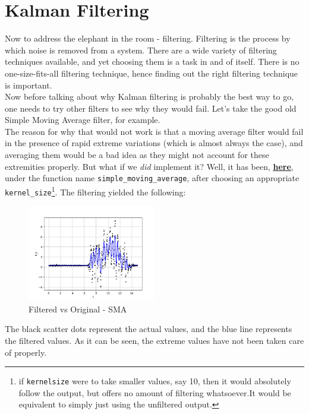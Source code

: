 \documentclass[oneside]{book}
\begin{document}
\chapter{Kalman Filtering} \label{Kalman Filter chapter}
Now to address the elephant in the room - filtering. Filtering is the process by which noise is removed from a system. There are a wide variety of filtering techniques available, and yet choosing them is a task in and of itself. There is no one-size-fits-all filtering technique, hence finding out the right filtering technique is important.\\ 
\bigskip
Now before talking about why Kalman filtering is probably the best way to go, one needs to try other filters to see why they would fail. Let's take the good old Simple Moving Average filter, for example. \\
The reason for why that would not work is that a moving average filter would fail in the presence of rapid extreme variations (which is almost always the case), and averaging them would be a bad idea as they might not account for these extremities properly.
But what if we \textit{did} implement it? Well, it has been, \href{https://github.com/HarryNyquist/Odometry/blob/main/Odometry_Bad_Tries/Bad_Filter_attempts.py}{\underline{\textbf{here}}}, under the function name \verb|simple_moving_average|, after choosing an appropriate \\ \verb|kernel_size|\footnote{if \texttt{kernel\textunderscore size} were to take smaller values, say 10, then it would absolutely follow the output, but offers no amount of filtering whatsoever.It would be equivalent to simply just using the unfiltered output.}. The filtering yielded the following:
\begin{figure}[htbp]
    \centering
    \includegraphics[width=0.5\textwidth]{figs/Filtered_using_SMA_downsampled.png}
    \caption{Filtered vs Original - SMA}
\end{figure}
\newpage
The black scatter dots represent the actual values, and the blue line represents the filtered values. As it can be seen, the extreme values have not been taken care of properly.  \\
\end{document}
